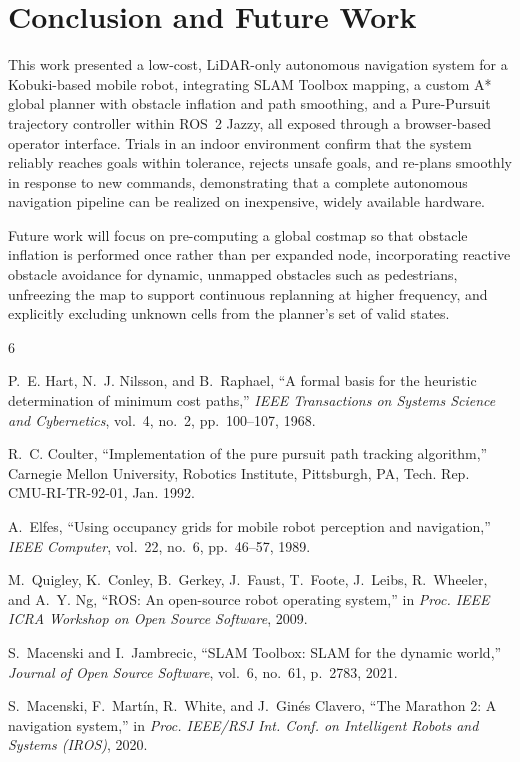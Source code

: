 \documentclass[10pt,twocolumn]{article}
\begin{document}
\section{Conclusion and Future Work}
This work presented a low-cost, LiDAR-only autonomous navigation system for a Kobuki-based mobile robot, integrating SLAM Toolbox mapping, a custom A* global planner with obstacle inflation and path smoothing, and a Pure-Pursuit trajectory controller within ROS~2 Jazzy, all exposed through a browser-based operator interface. Trials in an indoor environment confirm that the system reliably reaches goals within tolerance, rejects unsafe goals, and re-plans smoothly in response to new commands, demonstrating that a complete autonomous navigation pipeline can be realized on inexpensive, widely available hardware.

Future work will focus on pre-computing a global costmap so that obstacle inflation is performed once rather than per expanded node, incorporating reactive obstacle avoidance for dynamic, unmapped obstacles such as pedestrians, unfreezing the map to support continuous replanning at higher frequency, and explicitly excluding unknown cells from the planner's set of valid states.


\begin{thebibliography}{6}

P.~E. Hart, N.~J. Nilsson, and B.~Raphael, ``A formal basis for the heuristic determination of minimum cost paths,'' \emph{IEEE Transactions on Systems Science and Cybernetics}, vol.~4, no.~2, pp.~100--107, 1968.

R.~C. Coulter, ``Implementation of the pure pursuit path tracking algorithm,'' Carnegie Mellon University, Robotics Institute, Pittsburgh, PA, Tech. Rep. CMU-RI-TR-92-01, Jan. 1992.

A.~Elfes, ``Using occupancy grids for mobile robot perception and navigation,'' \emph{IEEE Computer}, vol.~22, no.~6, pp.~46--57, 1989.

M.~Quigley, K.~Conley, B.~Gerkey, J.~Faust, T.~Foote, J.~Leibs, R.~Wheeler, and A.~Y. Ng, ``ROS: An open-source robot operating system,'' in \emph{Proc. IEEE ICRA Workshop on Open Source Software}, 2009.

S.~Macenski and I.~Jambrecic, ``SLAM Toolbox: SLAM for the dynamic world,'' \emph{Journal of Open Source Software}, vol.~6, no.~61, p.~2783, 2021.

S.~Macenski, F.~Mart\'{i}n, R.~White, and J.~Gin\'{e}s Clavero, ``The Marathon 2: A navigation system,'' in \emph{Proc. IEEE/RSJ Int. Conf. on Intelligent Robots and Systems (IROS)}, 2020.

\end{thebibliography}
\end{document}
